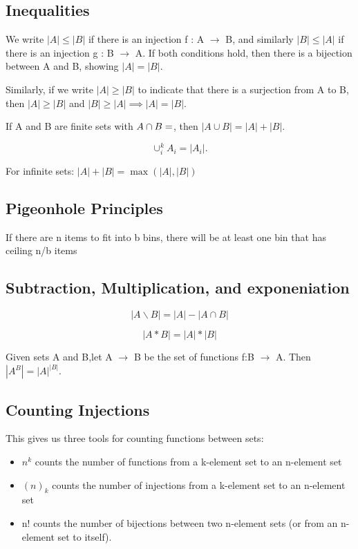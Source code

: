 \documentclass[twoside]{article}
\begin{document}
\subsection{Inequalities}

We write $|A| \leq |B|$ if there is an injection f : A $\rightarrow$  B, and similarly $|B| \leq |A|$ if there is an injection g : B $\rightarrow$ A. If both conditions hold, then there is a bijection between A and B, showing $|A| = |B|$.

Similarly, if we write $|A| \geq |B|$ to indicate that there is a surjection from A to B, then $|A| \geq |B|$ and $|B| \geq |A| \implies |A| = |B|$. 

If A and B are finite sets with $A \cap B = \empty$, then $|A ∪ B| = |A| + |B|$.

\begin{equation}
 \cup_i^k A_i  = |A_i|.
\end{equation}

For infinite sets: $|A| + |B| = \max(|A|, |B|)$

\subsection{Pigeonhole Principles}

If there are n items to fit into b bins, there will be at least one bin that 
has ceiling n/b items

\subsection{Subtraction, Multiplication, and exponeniation}
\begin{equation}
|A \backslash B| = |A| -  |A \cap B|
\end{equation}

\begin{equation}
|A * B| = |A| * |B|
\end{equation}

Given sets A and B,let A $\rightarrow$ B be the set of functions f:B $\rightarrow$ A. Then $|A^B| = |A|^{|B|}$.

\subsection{Counting Injections}
This gives us three tools for counting functions between sets: 

\begin{itemize}
\item $n^k$ counts the number of functions from a k-element set to an n-element set
\item $(n)_k$ counts the number of injections from a k-element set to an n-element set
\item n! counts the number of bijections between two n-element sets (or from an n-element set to itself).
\end{itemize} 
\end{document}
